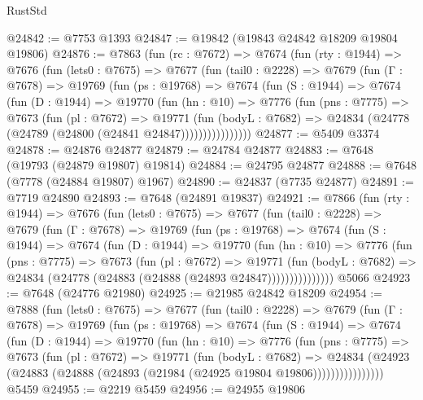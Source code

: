 \begin{lexlean}{RustStd}
\begin{coremodule}
@24842 := @7753 @1393
@24847 := @19842 (@19843 @24842 @18209 @19804 @19806)
@24876 := @7863
    (fun (rc : @7672) =>
    @7674
      (fun (rty : @1944) =>
      @7676
        (fun (lets0 : @7675) =>
        @7677
          (fun (tail0 : @2228) =>
          @7679
            (fun (Γ : @7678) =>
            @19769
              (fun (ps : @19768) =>
              @7674
                (fun (S : @1944) =>
                @7674
                  (fun (D : @1944) =>
                  @19770
                    (fun (hn : @10) =>
                    @7776
                      (fun (pns : @7775) =>
                      @7673
                        (fun (pl : @7672) =>
                        @19771
                          (fun (bodyL : @7682) =>
                          @24834 (@24778 (@24789 (@24800 (@24841 @24847))))))))))))))))
@24877 := @5409 @3374
@24878 := @24876 @24877
@24879 := @24784 @24877
@24883 := @7648 (@19793 (@24879 @19807) @19814)
@24884 := @24795 @24877
@24888 := @7648 (@7778 (@24884 @19807) @1967)
@24890 := @24837 (@7735 @24877)
@24891 := @7719 @24890
@24893 := @7648 (@24891 @19837)
@24921 := @7866
    (fun (rty : @1944) =>
    @7676
      (fun (lets0 : @7675) =>
      @7677
        (fun (tail0 : @2228) =>
        @7679
          (fun (Γ : @7678) =>
          @19769
            (fun (ps : @19768) =>
            @7674
              (fun (S : @1944) =>
              @7674
                (fun (D : @1944) =>
                @19770
                  (fun (hn : @10) =>
                  @7776
                    (fun (pns : @7775) =>
                    @7673
                      (fun (pl : @7672) =>
                      @19771
                        (fun (bodyL : @7682) =>
                        @24834 (@24778 (@24883 (@24888 (@24893 @24847)))))))))))))))
    @5066
@24923 := @7648 (@24776 @21980)
@24925 := @21985 @24842 @18209
@24954 := @7888
    (fun (lets0 : @7675) =>
    @7677
      (fun (tail0 : @2228) =>
      @7679
        (fun (Γ : @7678) =>
        @19769
          (fun (ps : @19768) =>
          @7674
            (fun (S : @1944) =>
            @7674
              (fun (D : @1944) =>
              @19770
                (fun (hn : @10) =>
                @7776
                  (fun (pns : @7775) =>
                  @7673
                    (fun (pl : @7672) =>
                    @19771
                      (fun (bodyL : @7682) =>
                      @24834
                        (@24923
                          (@24883 (@24888 (@24893 (@21984 (@24925 @19804 @19806))))))))))))))))
    @5459
@24955 := @2219 @5459
@24956 := @24955 @19806

\end{coremodule}
\end{lexlean}
